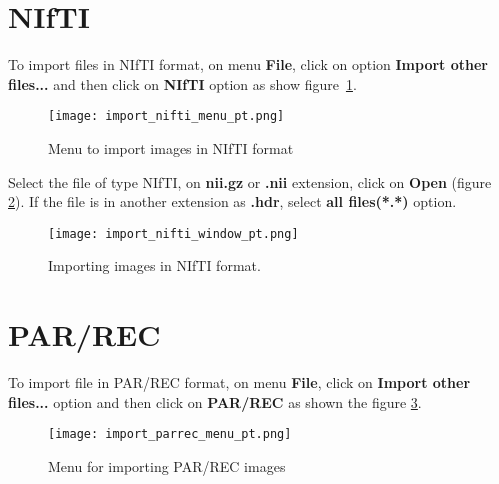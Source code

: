 \section{NIfTI}


To import files in NIfTI format, on menu \textbf{File}, click on option \textbf{Import other files...} and then click on \textbf{NIfTI} option as show figure~\ref{fig:import_nifti_menu_pt}.


\begin{figure}[!htb]
\centering
\texttt{[image: import\_nifti\_menu\_pt.png]}
\caption{Menu to import images in NIfTI format}
\label{fig:import_nifti_menu_pt}
\end{figure}


Select the file of type NIfTI, on \textbf{nii.gz} or \textbf{.nii} extension, click on \textbf{Open} (figure \ref{fig:import_nifti_window_pt}). If the file is in another extension as \textbf{.hdr}, select \textbf{all files(*.*)} option.


\begin{figure}[!htb]
\centering
\texttt{[image: import\_nifti\_window\_pt.png]}
\caption{Importing images in NIfTI format.}
\label{fig:import_nifti_window_pt}
\end{figure}

\section{PAR/REC}


To import file in PAR/REC format, on menu \textbf{File}, click on \textbf{Import other files...} option and then click on \textbf{PAR/REC} as shown the figure \ref{fig:import_parrec_menu_pt}.

\begin{figure}[!htb]
\centering
\texttt{[image: import\_parrec\_menu\_pt.png]}
\caption{Menu for importing PAR/REC images}
\label{fig:import_parrec_menu_pt}
\end{figure}

